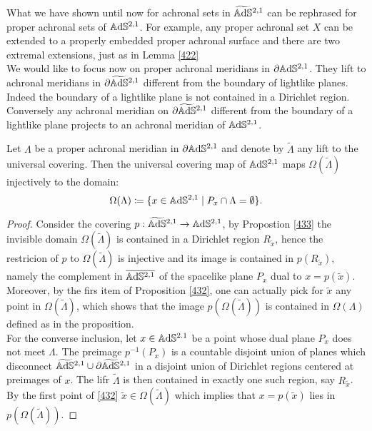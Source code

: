 What we have shown until now for achronal sets in $\widetilde{\mathbb{A}\mathrm{d}\mathbb{S}}{}^{2,1}$ can be rephrased for proper achronal sets of $\mathbb{A}\mathrm{d}\mathbb{S}^{2,1}$. For example, any proper achronal set $X$ can be extended to a properly embedded proper achronal surface and there are two extremal extensions, just as in Lemma \ref{422}\\
We would like to focus now on proper achronal meridians in $\partial\mathbb{A}\mathrm{d}\mathbb{S}^{2,1}$. They lift to achronal meridians in $\partial\widetilde{\mathbb{A}\mathrm{d}\mathbb{S}}{}^{2,1}$ different from the boundary of lightlike planes. Indeed the boundary of a lightlike plane is not contained in a Dirichlet region. Conversely any achronal meridian on $\partial\widetilde{\mathbb{A}\mathrm{d}\mathbb{S}}{}^{2,1}$ different from the boundary of a lightlike plane projects to an achronal meridian of $\mathbb{A}\mathrm{d}\mathbb{S}^{2,1}$.

\begin{proposition}
    Let $\Lambda$ be a proper achronal meridian in $\partial\mathbb{A}\mathrm{d}\mathbb{S}^{2,1}$ and denote by $\widetilde{\Lambda}$ any lift to the universal covering. Then the universal covering map of $\mathbb{A}\mathrm{d}\mathbb{S}^{2,1}$ maps $\Omega(\widetilde{\Lambda})$ injectively to the domain: 
    \[
        \Omega(\Lambda)\coloneqq \{x\in\mathbb{A}\mathrm{d}\mathbb{S}^{2,1}\;|\;P_x\cap\Lambda=\emptyset\}.
    \]
\end{proposition}
    
\begin{proof}
Consider the covering $p:\widetilde{\mathbb{A}\mathrm{d}\mathbb{S}}{}^{2,1}\to \mathbb{A}\mathrm{d}\mathbb{S}^{2,1}$, by Propostion \ref{433} the invisible domain $\Omega(\widetilde{\Lambda})$ is contained in a Dirichlet region $R_{\widetilde{x}}$, hence the restricion of $p$ to $\Omega(\widetilde{\Lambda})$ is injective and its image is contained in $p(R_{\widetilde{x}}),$ namely the complement in $\overline{\mathbb{A}\mathrm{d}\mathbb{S}^{2,1}}$ of the spacelike plane $P_x$ dual to $x=p(\widetilde{x})$. Moreover, by the firs item of Proposition \ref{432}, one can actually pick for $\widetilde{x}$ any point in $\Omega(\widetilde{\Lambda})$, which shows that the image $p(\Omega(\widetilde{\Lambda}))$ is contained in $\Omega(\Lambda)$ defined as in the proposition. \\ 
For the converse inclusion, let $x\in\mathbb{A}\mathrm{d}\mathbb{S}^{2.1}$ be a point whose dual plane $P_x$ does not meet $\Lambda$. The preimage $p^{-1}(P_x)$ is a countable disjoint union of planes which disconnect $\widetilde{\mathbb{A}\mathrm{d}\mathbb{S}}{}^{2,1}\cup \partial\widetilde{\mathbb{A}\mathrm{d}\mathbb{S}}{}^{2,1}$ in a disjoint union of Dirichlet regions centered at preimages of $x$. The lifr $\widetilde{\Lambda}$ is then contained in exactly one such region, say $R_{\widetilde{x}}$. By the first point of \ref{432} $\widetilde{x}\in\Omega(\widetilde{\Lambda})$ which implies that   $x=p(\widetilde{x})$ lies in $p(\Omega(\widetilde{\Lambda}))$. 
\end{proof}


